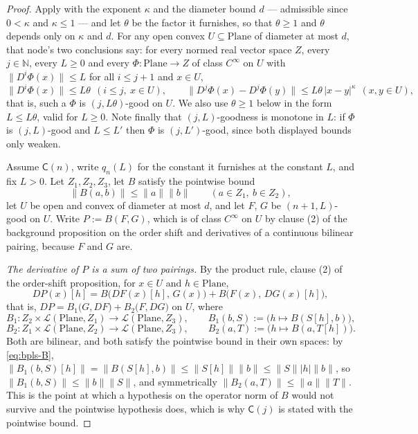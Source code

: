 \begin{proof}
Apply  with the exponent $\kappa$ and the diameter bound $d$ ---
admissible since $0<\kappa$ and $\kappa\le1$ --- and let $\theta$ be the factor it furnishes, so
that $\theta\ge1$ and $\theta$ depends only on $\kappa$ and $d$.  For any open convex
$U\subseteq\mathrm{Plane}$ of diameter at most $d$, that node's two conclusions say: for every
normed real vector space $Z$, every $j\in\mathbb{N}$, every $L\ge0$ and every
$\Phi\colon\mathrm{Plane}\to Z$ of class $C^{\infty}$ on $U$ with
$\lVert D^{i}\Phi(x)\rVert\le L$ for all $i\le j+1$ and $x\in U$,
\begin{equation}\label{eq:bpls-descent}
  \bigl\lVert D^{i}\Phi(x)\bigr\rVert\le L\theta\ \ (i\le j,\ x\in U),
  \qquad
  \bigl\lVert D^{j}\Phi(x)-D^{j}\Phi(y)\bigr\rVert\le L\theta\,\lvert x-y\rvert^{\kappa}
  \ \ (x,y\in U),
\end{equation}
that is, such a $\Phi$ is $(j,L\theta)$-good on $U$.  We also use $\theta\ge1$ below in the form
$L\le L\theta$, valid for $L\ge0$.  Note finally that $(j,L)$-goodness is monotone in $L$: if
$\Phi$ is $(j,L)$-good and $L\le L'$ then $\Phi$ is $(j,L')$-good, since both displayed bounds
only weaken.

Assume $\mathsf{C}(n)$, write $q_n(L)$ for the constant it furnishes at the constant $L$, and fix
$L>0$.  Let $Z_1,Z_2,Z_3$, let $B$ satisfy the pointwise bound
\begin{equation}\label{eq:bpls-B}
  \lVert B(a,b)\rVert\le\lVert a\rVert\lVert b\rVert\qquad(a\in Z_1,\ b\in Z_2),
\end{equation}
let $U$ be open and convex of diameter at most $d$, and let $F$, $G$ be $(n+1,L)$-good on $U$.
Write $P:=B(F,G)$, which is of class $C^{\infty}$ on $U$ by clause (2) of the background
proposition on the order shift and derivatives of a continuous bilinear pairing, because $F$ and
$G$ are.

\medskip\noindent\emph{The derivative of $P$ is a sum of two pairings.}
By the product rule, clause (2) of the order-shift proposition, for $x\in U$ and
$h\in\mathrm{Plane}$,
\[
  DP(x)[h]=B\bigl(DF(x)[h],\,G(x)\bigr)+B\bigl(F(x),\,DG(x)[h]\bigr),
\]
that is, $DP=B_1\bigl(G,DF\bigr)+B_2\bigl(F,DG\bigr)$ on $U$, where
\[
  B_1\colon Z_2\times\mathcal{L}(\mathrm{Plane},Z_1)\to\mathcal{L}(\mathrm{Plane},Z_3),
  \qquad B_1(b,S):=\bigl(h\mapsto B(S[h],b)\bigr),
\]
\[
  B_2\colon Z_1\times\mathcal{L}(\mathrm{Plane},Z_2)\to\mathcal{L}(\mathrm{Plane},Z_3),
  \qquad B_2(a,T):=\bigl(h\mapsto B(a,T[h])\bigr).
\]
Both are bilinear, and both satisfy the pointwise bound in their own spaces: by
\eqref{eq:bpls-B},
$\lVert B_1(b,S)[h]\rVert=\lVert B(S[h],b)\rVert\le\lVert S[h]\rVert\lVert b\rVert
 \le\lVert S\rVert\lvert h\rvert\lVert b\rVert$, so
$\lVert B_1(b,S)\rVert\le\lVert b\rVert\lVert S\rVert$, and symmetrically
$\lVert B_2(a,T)\rVert\le\lVert a\rVert\lVert T\rVert$.  This is the point at which a hypothesis
on the operator norm of $B$ would not survive and the pointwise hypothesis does, which is why
$\mathsf{C}(j)$ is stated with the pointwise bound.


\end{proof}
